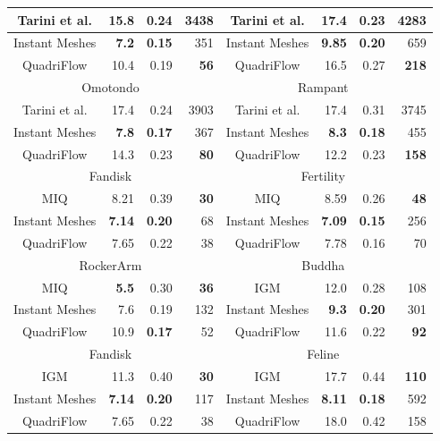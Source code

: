 \begin{table}
\begin{tabular}{|c|r|r|r|c|r|r|r|}
\hline
Tarini et al. & 15.8 & 0.24 & 3438 & Tarini et al. & 17.4 & 0.23 & 4283 \\
\hline
Instant Meshes & \textbf{7.2} & \textbf{0.15} & 351 & Instant Meshes & \textbf{9.85} & \textbf{0.20} & 659 \\
\hline
QuadriFlow & 10.4 & 0.19 & \textbf{56} & QuadriFlow & 16.5 & 0.27 & \textbf{218} \\
\hline
\multicolumn{4}{|c|}{Omotondo~\cite{tarini2010practical}} & \multicolumn{4}{c|}{Rampant~\cite{tarini2010practical}}  \\
\hline
Tarini et al. & 17.4 & 0.24 & 3903 & Tarini et al. & 17.4 & 0.31 & 3745 \\
\hline
Instant Meshes & \textbf{7.8} & \textbf{0.17} & 367 & Instant Meshes & \textbf{8.3} & \textbf{0.18} & 455 \\
\hline
QuadriFlow & 14.3 & 0.23 & \textbf{80} & QuadriFlow & 12.2 & 0.23 & \textbf{158} \\
\hline
\multicolumn{4}{|c|}{Fandisk~\cite{bommes2009mixed}}  & \multicolumn{4}{c|}{Fertility~\cite{bommes2009mixed}}  \\
\hline
MIQ & 8.21 & 0.39 & \textbf{30} & MIQ & 8.59 & 0.26 & \textbf{48} \\
\hline
Instant Meshes & \textbf{7.14} & \textbf{0.20} & 68 & Instant Meshes & \textbf{7.09} & \textbf{0.15} & 256 \\
\hline
QuadriFlow & 7.65 & 0.22 & 38 & QuadriFlow & 7.78 & 0.16 & 70 \\
\hline
\multicolumn{4}{|c|}{RockerArm~\cite{bommes2009mixed}} & \multicolumn{4}{c|}{Buddha~\cite{bommes2013integer}}  \\
\hline
MIQ & \textbf{5.5} & 0.30 & \textbf{36} & IGM & 12.0 & 0.28 & 108 \\
\hline
Instant Meshes & 7.6 & 0.19 & 132 & Instant Meshes & \textbf{9.3} & \textbf{0.20} & 301 \\
\hline
QuadriFlow & 10.9 & \textbf{0.17} & 52 & QuadriFlow & 11.6 & 0.22 & \textbf{92} \\
\hline
\multicolumn{4}{|c|}{Fandisk~\cite{bommes2013integer}}  & \multicolumn{4}{c|}{Feline~\cite{bommes2013integer}}  \\
\hline
IGM & 11.3 & 0.40 & \textbf{30} & IGM & 17.7 & 0.44 & \textbf{110} \\
\hline
Instant Meshes & \textbf{7.14} & \textbf{0.20} & 117 & Instant Meshes & \textbf{8.11} & \textbf{0.18} & 592 \\
\hline
QuadriFlow & 7.65 & 0.22 & 38 & QuadriFlow & 18.0 & 0.42 & 158 \\

\end{tabular}
\end{table}
